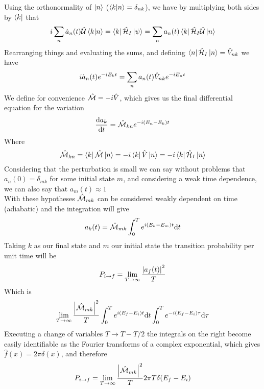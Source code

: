 \documentclass[../qm.tex]{subfiles}
\begin{document}
Using the orthonormality of $\ket{n}$ ($\bra{k}\ket{n}=\delta_{nk}$), we have by multiplying both sides by $\bra{k}$ that
\begin{equation*}
	i\sum_n\dot{a}_n(t)\hat{\mathcal{U}}\bra{k}\ket{n}=\bra{k}\hat{\mathcal{H}}_I\ket{\psi}=\sum_na_n(t)\bra{k}\hat{\mathcal{H}}_I\hat{\mathcal{U}}\ket{n}
\end{equation*}
Rearranging things and evaluating the sums, and defining $\bra{n}\hat{\mathcal{H}}_I\ket{n}=\hat{V}_{nk}$ we have
\begin{equation*}
	i\dot{a}_n(t)e^{-iE_kt}=\sum_na_n(t)\hat{V}_{nk}e^{-iE_nt}
\end{equation*}
We define for convenience $\hat{\mathcal{M}}=-i\hat{V}$, which gives us the final differential equation for the variation
\begin{equation}
	\dv{a_k}{t}=\hat{\mathcal{M}}_{kn}e^{-i(E_n-E_k)t}
	\label{eq:finalevalddeq}
\end{equation}
Where
\begin{equation}
	\hat{\mathcal{M}}_{kn}=\bra{k}\hat{\mathcal{M}}\ket{n}=-i\bra{k}\hat{V}\ket{n}=-i\bra{k}\hat{\mathcal{H}}_I\ket{n}
	\label{eq:transmatrixdef}
\end{equation}
Considering that the perturbation is small we can say without problems that $a_n(0)=\delta_{mk}$ for some initial state $m$, and considering a weak time dependence, we can also say that $a_m(t)\approx1$\\
With these hypotheses $\hat{\mathcal{M}}_{mk}$ can be considered weakly dependent on time (adiabatic) and the integration will give
\begin{equation*}
	a_k(t)=\hat{\mathcal{M}}_{mk}\int_{0}^{T}e^{i(E_k-E_m)t}\dd t
\end{equation*}
Taking $k$ as our final state and $m$ our initial state the transition probability per unit time will be
\begin{equation}
	P_{i\to f}=\lim_{T\to\infty}\frac{\abs{a_f(t)}^2}{T}
	\label{eq:gammatransprobdef}
\end{equation}
Which is
\begin{equation*}
	\lim_{T\to\infty}\frac{\abs{\hat{\mathcal{M}}_{mk}}^2}{T}\int_{0}^{T}e^{i(E_f-E_i)t}\dd t\int_{0}^{T}e^{-i(E_f-E_i)\tau}\dd\tau
\end{equation*}
Executing a change of variables $T\to T-T/2$ the integrals on the right become easily identifiable as the Fourier transforms of a complex exponential, which gives $\hat{f}(x)=2\pi\delta(x)$, and therefore
\begin{equation*}
	P_{i\to f}=\lim_{T\to\infty}\frac{\abs{\hat{\mathcal{M}}_{mk}}^2}{T}2\pi T\delta(E_f-E_i)
\end{equation*}
\end{document}
